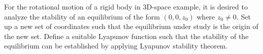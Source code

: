 \question[20]
%
For the rotational motion of a rigid body in $3$D-space example, it is desired
to analyze the stability of an equilibrium of the form $(0, 0, z_0)$ where $z_0
\neq 0$. Set up a new set of coordinates such that the equilibrium under study 
is the origin of the new set. Define a suitable Lyapunov function such that the 
stability of the equilibrium can be established by applying Lyapunov stability 
theorem.

\begin{solution}



\end{solution}